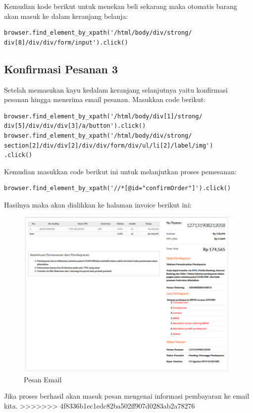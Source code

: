 Kemudian kode berikut untuk menekan beli sekarang maka otomatis barang akan masuk ke dalam keranjang belanja:
\begin{verbatim}
browser.find_element_by_xpath('/html/body/div/strong/
div[8]/div/div/form/input').click()
\end{verbatim}

\newpage
\subsection{Konfirmasi Pesanan 3}
Setelah memasukan kayu kedalam keranjang selanjutnya yaitu konfirmasi pesanan hingga menerima email pesanan. 
Masukkan code berikut:
\begin{verbatim}
browser.find_element_by_xpath('/html/body/div[1]/strong/
div[5]/div/div/div[3]/a/button').click()
browser.find_element_by_xpath('/html/body/div/strong/
section[2]/div/div[2]/div/div/form/div/ul/li[2]/label/img')
.click()
\end{verbatim}

Kemudian masukkan code berikut ini untuk melanjutkan proses pemesanan:
\begin{verbatim}
browser.find_element_by_xpath('//*[@id="confirmOrder"]').click()
\end{verbatim}

Hasilnya maka akan dialihkan ke halaman invoice berikut ini:
\begin{figure}[h]
	\centering
	\includegraphics[scale=0.30]{figures/6invoice}
	\caption{Pesan Email}
\end{figure}

Jika proses berhasil akan masuk pesan mengenai informasi pembayaran ke email kita.
>>>>>>> 4f8336b1ec1edc82ba502ff907d0283ab2a78276


